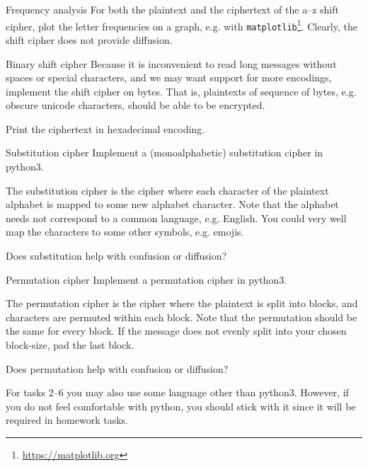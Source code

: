 \documentclass{practice}
\begin{document}
\begin{task}{Frequency analysis}
  For both the plaintext and the ciphertext of the a--z shift cipher, plot the letter frequencies on a graph, e.g. with \texttt{matplotlib}\footnote{\url{https://matplotlib.org}}.
  Clearly, the shift cipher does not provide diffusion.
\end{task}

\begin{task}{Binary shift cipher}
  Because it is inconvenient to read long messages without spaces or special characters, and we may want support for more encodings, implement the shift cipher on bytes.
  That is, plaintexts of sequence of bytes, e.g. obscure unicode characters, should be able to be encrypted.

  Print the ciphertext in hexadecimal encoding.
\end{task}

\begin{task}{Substitution cipher}
  Implement a (monoalphabetic) substitution cipher in python3.

  The substitution cipher is the cipher where each character of the plaintext alphabet is mapped to some new alphabet character.
  Note that the alphabet needs not correspond to a common language, e.g. English.
  You could very well map the characters to some other symbols, e.g. emojis.

  Does substitution help with confusion or diffusion?
\end{task}

\begin{task}{Permutation cipher}
  Implement a permutation cipher in python3.

  The permutation cipher is the cipher where the plaintext is split into blocks, and characters are permuted within each block.
  Note that the permutation should be the same for every block.
  If the message does not evenly split into your chosen block-size, pad the last block.

  Does permutation help with confusion or diffusion?
\end{task}

\begin{tcolorbox}[title=Note]
  For tasks 2--6 you may also use some language other than python3.
  However, if you do not feel comfortable with python, you should stick with it since it will be required in homework tasks.
\end{tcolorbox}
\end{document}
